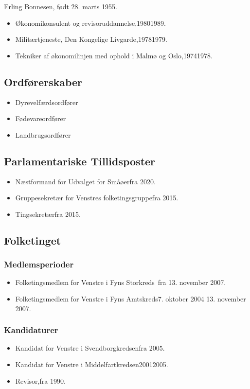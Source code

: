 \documentclass[11pt, a4paper]{awesome-cv}
\begin{document}
\makecvheader[R]
\makelettertitle
\begin{cvletter}
Erling Bonnesen, født 28. marts 1955.

\begin{itemize}
\item Økonomikonsulent og revisoruddannelse,19801989.
\item Militærtjeneste, Den Kongelige Livgarde,19781979.
\item Tekniker af økonomilinjen med ophold i Malmø og Oslo,19741978.
\end{itemize}
\subsection*{Ordførerskaber}
\begin{itemize}
\item Dyrevelfærdsordfører
\item Fødevareordfører
\item Landbrugsordfører
\end{itemize}
\subsection*{Parlamentariske Tillidsposter}
\begin{itemize}
\item Næstformand for Udvalget for Småøerfra 2020.
\item Gruppesekretær for Venstres folketingsgruppefra 2015.
\item Tingsekretærfra 2015.
\end{itemize}
\subsection*{Folketinget}
\subsubsection*{Medlemsperioder}
\begin{itemize}
\item Folketingsmedlem for Venstre i Fyns Storkreds fra 13. november 2007.
\item Folketingsmedlem for Venstre i Fyns Amtskreds7. oktober 2004  13. november 2007.
\end{itemize}
\subsubsection*{Kandidaturer}
\begin{itemize}
\item Kandidat for Venstre i Svendborgkredsenfra 2005.
\item Kandidat for Venstre i Middelfartkredsen20012005.
\end{itemize}
\begin{itemize}
\item Revisor,fra 1990.
\end{itemize}
\end{cvletter}
\end{document}

